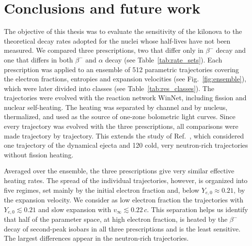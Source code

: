 
\chapter{Conclusions and future work}\label{ch:conclutions}

The objective of this thesis was to evaluate the sensitivity of the kilonova to the theoretical decay rates adopted for the nuclei whose half-lives have not been measured.
We compared three prescriptions, two that differ only in $\beta^{-}$ decay and one that differs in both $\beta^{-}$ and $\alpha$ decay (see Table~\ref{tab:rate_sets}).
Each prescription was applied to an ensemble of 512 parametric trajectories covering the electron fractions, entropies and expansion velocities (see Fig.~\ref{fig:ensemble}), which were later divided into classes (see Table~\ref{tab:res_classes}).
The trajectories were evolved with the reaction network WinNet, including fission and nuclear self-heating.
The heating was separated by channel and by nucleus, thermalized, and used as the source of one-zone bolometric light curves.
Since every trajectory was evolved with the three prescriptions, all comparisons were made trajectory by trajectory.
This extends the study of Ref.~\cite{hernandez_porras_features_2027}, which considered one trajectory of the dynamical ejecta and 120 cold, very neutron-rich trajectories without fission heating.


Averaged over the ensemble, the three prescriptions give very similar effective heating rates.
The spread of the individual trajectories, however, is organized into five regimes, set mainly by the initial electron fraction and, below $Y_{e,0}\approx0.21$, by the expansion velocity.
We consider as low electron fraction the trajectories with $Y_{e,0}\lesssim 0.21$ and slow expansion with $v_\infty\lesssim0.22\,c$.
This separation helps us identify that half of the parameter space, at high electron fraction, is heated by the $\beta^-$ decay of second-peak isobars in all three prescriptions and is the least sensitive.
The largest differences appear in the neutron-rich trajectories.

